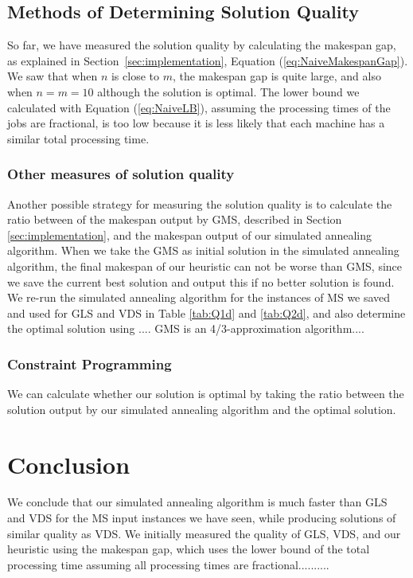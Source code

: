 \documentclass[12pt,a4paper,reqno]{article}
\begin{document}
\newpage
\subsection{Methods of Determining Solution Quality} \label{subsec:SolQual}
So far, we have measured the solution quality by calculating the makespan gap, as explained in Section~\ref{sec:implementation}, Equation (\ref{eq:NaiveMakespanGap}). We saw that when $n$ is close to $m$, the makespan gap is quite large, and also when $n=m=10$ although the solution is optimal. The lower bound we calculated with Equation (\ref{eq:NaiveLB}), assuming the processing times of the jobs are fractional, is too low because it is less likely that each machine has a similar total processing time.  \\

\subsubsection{Other measures of solution quality}
\color{red}
Another possible strategy for measuring the solution quality is to calculate the ratio between of the makespan output by GMS, described in Section \ref{sec:implementation}, and the makespan output of our simulated annealing algorithm. When we take the GMS as initial solution in the simulated annealing algorithm, the final makespan of our heuristic can not be worse than GMS, since we save the current best solution and output this if no better solution is found. We re-run the simulated annealing algorithm for the instances of MS we saved and used for GLS and VDS in Table \ref{tab:Q1d} and \ref{tab:Q2d}, and also determine the optimal solution using ....
GMS is an 4/3-approximation algorithm.... 
\color{black}


\subsubsection{Constraint Programming}
We can calculate whether our solution is optimal by taking the ratio between the solution output by our simulated annealing algorithm and the optimal solution.







\section{Conclusion}
We conclude that our simulated annealing algorithm is much faster than GLS and VDS for the MS input instances we have seen, while producing solutions of similar quality as VDS. We initially measured the quality of GLS, VDS, and our heuristic using the makespan gap, which uses the lower bound of the total processing time assuming all processing times are fractional.......... 
\end{document}
